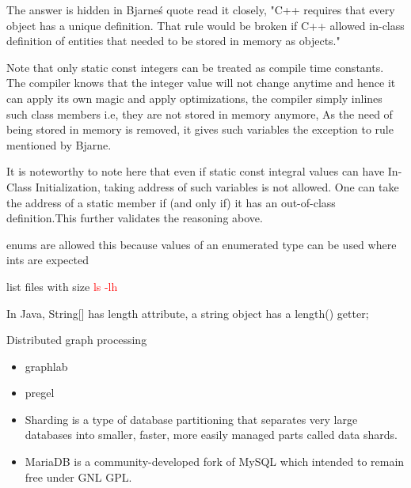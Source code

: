 \documentclass[a4paper]{tufte-handout}
\begin{document}
The answer is hidden in Bjarne\'s quote read it closely,
"C++ requires that every object has a unique definition. That rule would be broken if C++ allowed in-class definition of entities that needed to be stored in memory as objects."

Note that only static const integers can be treated as compile time constants. The compiler knows that the integer value will not change anytime and hence it can apply its own magic and apply optimizations, the compiler simply inlines such class members i.e, they are not stored in memory anymore, As the need of being stored in memory is removed, it gives such variables the exception to rule mentioned by Bjarne.

It is noteworthy to note here that even if static const integral values can have In-Class Initialization, taking address of such variables is not allowed. One can take the address of a static member if (and only if) it has an out-of-class definition.This further validates the reasoning above.

enums are allowed this because values of an enumerated type can be used where ints are expected

list files with size \textcolor{red}{ls -lh}

In Java, String[] has length attribute, a string object has a length() getter;

Distributed graph processing
\begin{itemize}
\item graphlab
\item pregel
\end{itemize}


\begin{itemize}
\item Sharding is a type of database partitioning that separates very large databases into smaller, faster, more easily managed parts called data shards.
\item MariaDB is a community-developed fork of MySQL which intended to remain free under GNL GPL.
\end{itemize}
\end{document}
